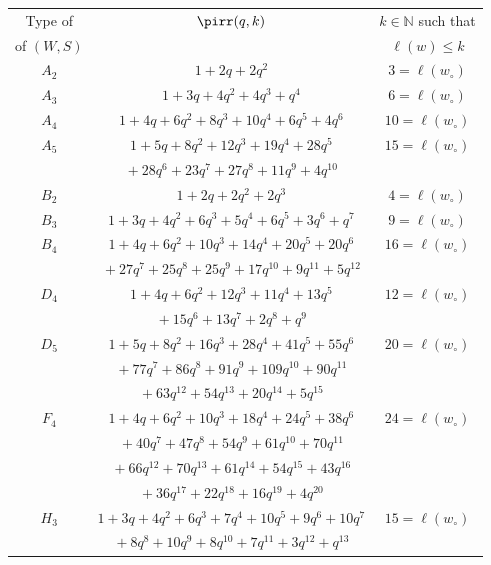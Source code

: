 \documentclass[Unicode]{cedram-alco}
\theoremstyle{definition}
\begin{document}
\begin{table}
\renewcommand\arraystretch{1.25}
\begin{center} 
\begin{tabular}{|c|c|c|}
\hline
Type of   &   $\pirr(q,k)$   & $k\in\mathbb N$ such that  \\
of $(W,S)$  & $ $   &$\ell(w)\leq k$  \\
  \hline \hline
  $A_2$& $1+2q+2q^2$&$3=\ell(w_\circ)$\\
  \hline
  $A_3$& $1 + 3q + 4q^2 + 4q^3 + q^4$&$6=\ell(w_\circ)$\\
  \hline
  $A_4$& $1 + 4q + 6q^2 + 8q^3 + 10q^4 + 6q^5 + 4q^6$&$10=\ell(w_\circ)$\\
    \hline
  $A_5$& $1 + 5q + 8q^2 + 12q^3 + 19q^4 + 28q^5 $&$15=\ell(w_\circ)$\\
  &${}+ 28q^6 + 23q^7 + 27q^8 + 11q^9 + 4q^{10}$& \\
 \hline
  $B_2$& $1 + 2q + 2q^2 + 2q^3 $&$4=\ell(w_\circ)$\\ 
   \hline
  $B_3$& $1 + 3q + 4q^2 + 6q^3 + 5q^4 + 6q^5 + 3q^6 + q^7 $&$9=\ell(w_\circ)$\\ 
   \hline
  $B_4$& $1 + 4q + 6q^2 + 10q^3 + 14q^4 + 20q^5 + 20q^6  $&$16=\ell(w_\circ)$\\ 
    &${}+ 27q^7 + 25q^8 + 25q^9 + 17q^{10} + 9q^{11} + 5q^{12}$& \\
     \hline
  $D_4$& $1 + 4q + 6q^2 + 12q^3 + 11q^4 + 13q^5 $&$12=\ell(w_\circ)$\\
       &${}+ 15q^6 + 13q^7 + 2q^8 + q^9$& \\
    \hline
  $D_5$& $ 1 + 5q + 8q^2 + 16q^3 + 28q^4 + 41q^5 + 55q^6  $&$20=\ell(w_\circ)$\\
       &${}+ 77q^7 + 86q^8 + 91q^9+ 109q^{10} + 90q^{11}  $& \\
       &${}+ 63q^{12} + 54q^{13} + 20q^{14} + 5q^{15} $& \\
 \hline
  $F_4$& $ 1 + 4q + 6q^2 + 10q^3 + 18q^4 + 24q^5 + 38q^6   $&$24=\ell(w_\circ)$\\
       &${} + 40q^7 + 47q^8+ 54q^9 + 61q^{10} + 70q^{11}  $& \\
       &${}+ 66q^{12} + 70q^{13} + 61q^{14} + 54q^{15} + 43q^{16} $& \\
       &${} + 36q^{17} + 22q^{18} + 16q^{19} + 4q^{20} $& \\
 \hline
  $H_3$& $1 + 3q + 4q^2 + 6q^3 + 7q^4 + 10q^5 + 9q^6 + 10q^7  $&$15=\ell(w_\circ)$\\ 
    &${}+ 8q^8 + 10q^9 + 8q^{10} + 7q^{11} + 3q^{12} + q^{13}$& \\

\end{tabular}
\end{center}
\end{table}
\end{document}
